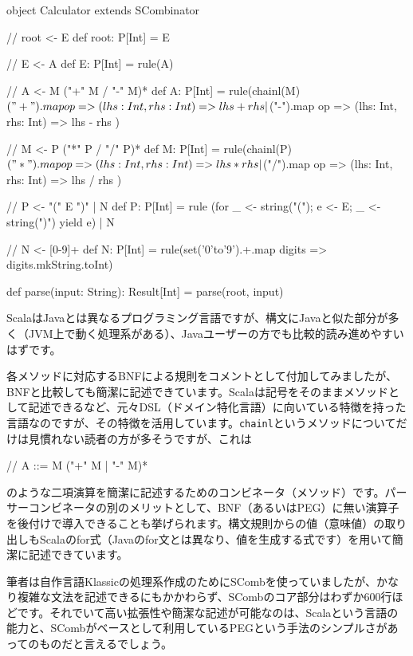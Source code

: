 \begin{codescreen}{}
object Calculator extends SCombinator {
  // root <- E 
  def root: P[Int] = E

  // E <- A
  def E: P[Int] = rule(A)

  // A <- M ("+" M / "-" M)* 
  def A: P[Int] = rule(chainl(M) {
    $("+").map { op => (lhs: Int, rhs: Int) => lhs + rhs } |
    $("-").map { op => (lhs: Int, rhs: Int) => lhs - rhs }
  })

  // M <- P ("*" P / "/" P)* 
  def M: P[Int] = rule(chainl(P) {
    $("*").map { op => (lhs: Int, rhs: Int) => lhs * rhs } |
    $("/").map { op => (lhs: Int, rhs: Int) => lhs / rhs }
  })

  // P <- "(" E ")" | N
  def P: P[Int] = rule{
    (for {
      _ <- string("("); e <- E; _ <- string(")")} yield e) | N
  }
  
  // N <- [0-9]+ 
  def N: P[Int] = rule(set('0'to'9').+.map{ digits => digits.mkString.toInt})

  def parse(input: String): Result[Int] = parse(root, input)
}
\end{codescreen}

ScalaはJavaとは異なるプログラミング言語ですが、構文にJavaと似た部分が多く（JVM上で動く処理系がある）、Javaユーザーの方でも比較的読み進めやすいはずです。

各メソッドに対応するBNFによる規則をコメントとして付加してみましたが、BNFと比較しても簡潔に記述できています。Scalaは記号をそのままメソッドとして記述できるなど、元々DSL（ドメイン特化言語）に向いている特徴を持った言語なのですが、その特徴を活用しています。\texttt{chainl}というメソッドについてだけは見慣れない読者の方が多そうですが、これは

\begin{codescreen}{}
// A ::= M ("+" M | "-" M)*
\end{codescreen}

\noindent のような二項演算を簡潔に記述するためのコンビネータ（メソッド）です。パーサーコンビネータの別のメリットとして、BNF（あるいはPEG）に無い演算子を後付けで導入できることも挙げられます。構文規則からの値（意味値）の取り出しもScalaのfor式（Javaのfor文とは異なり、値を生成する式です）を用いて簡潔に記述できています。

筆者は自作言語Klassicの処理系作成のためにSCombを使っていましたが、かなり複雑な文法を記述できるにもかかわらず、SCombのコア部分はわずか600行ほどです。それでいて高い拡張性や簡潔な記述が可能なのは、Scalaという言語の能力と、SCombがベースとして利用しているPEGという手法のシンプルさがあってのものだと言えるでしょう。

